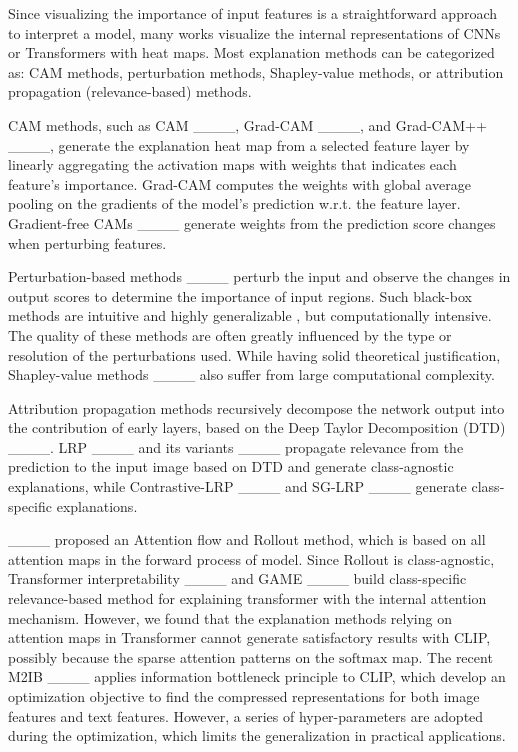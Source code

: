 Since visualizing the importance of input features is a straightforward approach to interpret a model, many works visualize the internal representations of CNNs or Transformers with heat maps. Most explanation methods can be categorized as: CAM methods, perturbation methods, Shapley-value methods, or attribution propagation (relevance-based) methods.

CAM methods, such as CAM ____, Grad-CAM ____, and Grad-CAM++ ____, generate the explanation heat map from a selected  feature layer by linearly aggregating the activation maps with weights that indicates each feature's importance. Grad-CAM computes the weights with global average pooling on the gradients of the model's prediction w.r.t. the feature layer. Gradient-free CAMs ____ generate weights from the prediction score changes when perturbing features.

Perturbation-based methods ____ perturb the  input and observe the changes in output scores to determine the importance of input regions. Such black-box methods are intuitive and highly generalizable , but computationally intensive. The quality of these methods are often greatly influenced by the type or resolution of the perturbations used.
While having solid theoretical justification, Shapley-value methods ____ also suffer from large computational complexity. 

Attribution propagation methods recursively decompose the network output into the contribution of early layers, based on the Deep Taylor Decomposition (DTD) ____. LRP ____ and its variants ____ propagate relevance from the prediction to the input image based on  DTD and generate class-agnostic explanations, while Contrastive-LRP ____ and SG-LRP ____ generate class-specific explanations.

 ____ proposed an Attention flow and Rollout method, which is based on all attention maps in the forward process of model. Since Rollout is class-agnostic, Transformer interpretability ____ and GAME ____ build class-specific relevance-based method for explaining transformer with the internal attention mechanism. However, we found that the explanation methods relying on attention maps in Transformer cannot generate satisfactory results with CLIP, possibly because the sparse attention patterns on the $\mathrm{softmax}$ map.
The recent M2IB ____ applies information bottleneck principle to CLIP, which develop an optimization objective to find the compressed representations for both image features and text features. However, a series of hyper-parameters are adopted during the optimization, which limits the generalization in practical applications.

